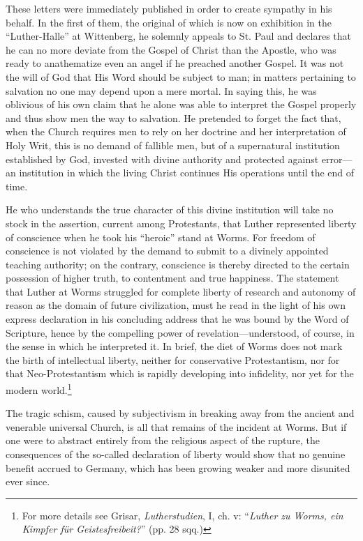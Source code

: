 These letters were
immediately published in order to create sympathy in his behalf.
In the first of them, the original of which is now on exhibition in the
“Luther-Halle” at Wittenberg, he solemnly appeals to St. Paul and
declares that he can no more deviate from the Gospel of Christ than
the Apostle, who was ready to anathematize even an angel if he
preached another Gospel. It was not the will of God that His Word
should be subject to man; in matters pertaining to salvation no one
may depend upon a mere mortal. In saying this, he was oblivious of
his own claim that he alone was able to interpret the Gospel properly
and thus show men the way to salvation. He pretended to forget the
fact that, when the Church requires men to rely on her doctrine and
her interpretation of Holy Writ, this is no demand of fallible men,
but of a supernatural institution established by God, invested with
divine authority and protected against error—an institution in which
the living Christ continues His operations until the end of time.

He who understands the true character of this divine institution will take
no stock in the assertion, current among Protestants, that
Luther represented liberty of conscience when he took his “heroic”
stand at Worms. For freedom of conscience is not violated by the
demand to submit to a divinely appointed teaching authority; on
the contrary, conscience is thereby directed to the certain possession
of higher truth, to contentment and true happiness. The statement
that Luther at Worms struggled for complete liberty of research
and autonomy of reason as the domain of future civilization, must
he read in the light of his own express declaration in his concluding
address that he was bound by the Word of Scripture, hence by the
compelling power of revelation—understood, of course, in the sense
in which he interpreted it. In brief, the diet of Worms does not
mark the birth of intellectual liberty, neither for conservative Protestantism,
nor for that Neo-Protestantism which is rapidly developing into infidelity,
nor yet for the modern world.\footnote
{For more details see Grisar, \textit{Lutherstudien}, I, ch. v: ``\textit{Luther zu Worms, ein Kimpfer
für Geistesfreibeit?}'' (pp. 28 sqq.)}

The tragic schism, caused by subjectivism in breaking away from
the ancient and venerable universal Church, is all that remains of
the incident at Worms. But if one were to abstract entirely from
the religious aspect of the rupture, the consequences of the so-called
declaration of liberty would show that no genuine benefit accrued
to Germany, which has been growing weaker and more disunited
ever since.

